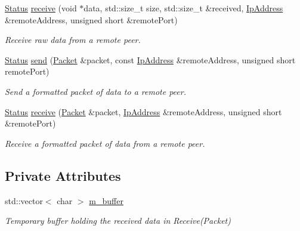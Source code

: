 \begin{DoxyCompactItemize}
\mbox{\hyperlink{classsf_1_1_socket_a51bf0fd51057b98a10fbb866246176dc}{Status}} \mbox{\hyperlink{classsf_1_1_udp_socket_ade9ca0f7ed7919136917b0b997a9833a}{receive}} (void $\ast$data, std\+::size\+\_\+t size, std\+::size\+\_\+t \&received, \mbox{\hyperlink{classsf_1_1_ip_address}{Ip\+Address}} \&remote\+Address, unsigned short \&remote\+Port)
\begin{DoxyCompactList}\small\item\em Receive raw data from a remote peer. \end{DoxyCompactList}\item 
\mbox{\hyperlink{classsf_1_1_socket_a51bf0fd51057b98a10fbb866246176dc}{Status}} \mbox{\hyperlink{classsf_1_1_udp_socket_a48969a62c80d40fd74293a740798e435}{send}} (\mbox{\hyperlink{classsf_1_1_packet}{Packet}} \&packet, const \mbox{\hyperlink{classsf_1_1_ip_address}{Ip\+Address}} \&remote\+Address, unsigned short remote\+Port)
\begin{DoxyCompactList}\small\item\em Send a formatted packet of data to a remote peer. \end{DoxyCompactList}\item 
\mbox{\hyperlink{classsf_1_1_socket_a51bf0fd51057b98a10fbb866246176dc}{Status}} \mbox{\hyperlink{classsf_1_1_udp_socket_afdd5c655d00c96222d5b477fc057a22b}{receive}} (\mbox{\hyperlink{classsf_1_1_packet}{Packet}} \&packet, \mbox{\hyperlink{classsf_1_1_ip_address}{Ip\+Address}} \&remote\+Address, unsigned short \&remote\+Port)
\begin{DoxyCompactList}\small\item\em Receive a formatted packet of data from a remote peer. \end{DoxyCompactList}\end{DoxyCompactItemize}
\subsection*{Private Attributes}
\begin{DoxyCompactItemize}
\item 
\mbox{\label{classsf_1_1_udp_socket_a251adcf2bc0bed2d4b7c364b3bc65a42}} 
std\+::vector$<$ char $>$ \mbox{\hyperlink{classsf_1_1_udp_socket_a251adcf2bc0bed2d4b7c364b3bc65a42}{m\+\_\+buffer}}
\begin{DoxyCompactList}\small\item\em Temporary buffer holding the received data in Receive(\+Packet) \end{DoxyCompactList}\end{DoxyCompactItemize}
